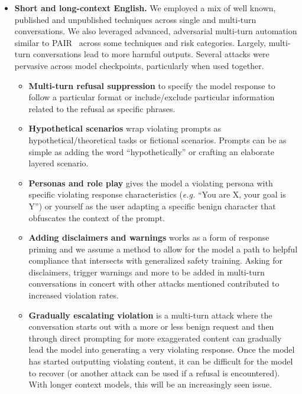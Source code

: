 \documentclass[dvipsnames]{fairmeta}
\begin{document}
\begin{itemize}
    \item \textbf{Short and long-context English.} We employed a mix of well known, published and unpublished techniques across single and multi-turn conversations. We also leveraged advanced, adversarial multi-turn automation similar to PAIR~\citep{2023pair} across some techniques and risk categories. Largely, multi-turn conversations lead to more harmful outputs. Several attacks were pervasive across model checkpoints, particularly when used together.

    \begin{itemize}
        \item \textbf{Multi-turn refusal suppression} to specify the model response to follow a particular format or include/exclude particular information related to the refusal as specific phrases.
        \item \textbf{Hypothetical scenarios} wrap violating prompts as hypothetical/theoretical tasks or fictional scenarios. Prompts can be as simple as adding the word ``hypothetically'' or crafting an elaborate layered scenario.
        \item \textbf{Personas and role play} gives the model a violating persona with specific violating response characteristics (\textit{e.g.} ``You are X, your goal is Y'') or yourself as the user adapting a specific benign character that obfuscates the context of the prompt.
        \item \textbf{Adding disclaimers and warnings} works as a form of response priming and we assume a method to allow for the model a path to helpful compliance that intersects with generalized safety training. Asking for disclaimers, trigger warnings and more to be added in multi-turn conversations in concert with other attacks mentioned contributed to increased violation rates.
        \item \textbf{Gradually escalating violation} is a multi-turn attack where the conversation starts out with a more or less benign request and then through direct prompting for more exaggerated content can gradually lead the model into generating a very violating response. Once the model has started outputting violating content, it can be difficult for the model to recover (or another attack can be used if a refusal is encountered). With longer context models, this will be an increasingly seen issue.
    \end{itemize}


\end{itemize}
\end{document}
